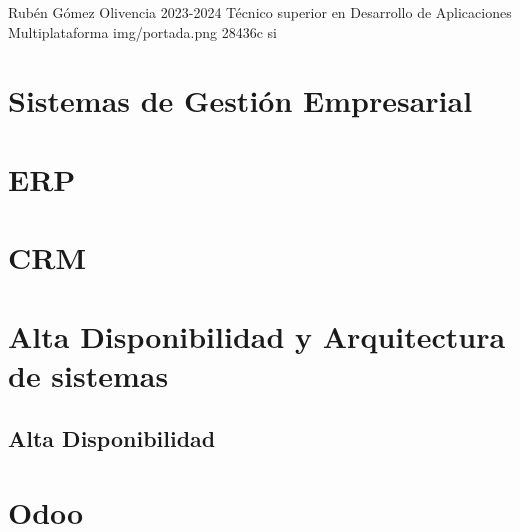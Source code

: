 \documentclass{\ClassPath/yukibook}
\begin{document}
    {Rubén Gómez Olivencia}  %
    {2023-2024}    %
    {Técnico superior en \linebreak Desarrollo de  Aplicaciones Multiplataforma} %
    {}%
    {}%
    {img/portada.png} %
    {28436c}
    {si} %

    \coverpage
    \graphicspath{{../../../yukibook.cls/}}
    \licensepage

    \tableofcontents


    \part{Sistemas de Gestión Empresarial}
    \graphicspath{{./img/sge}}
    


    \part{ERP}
    

    \part{CRM}
    


    \part{Alta Disponibilidad y Arquitectura de sistemas}
    \chapter{Alta Disponibilidad}
    
    \graphicspath{{../../../temas_comunes/arquitectura_sistemas/img/}}
    

    \part{Odoo}
    

\end{document}
